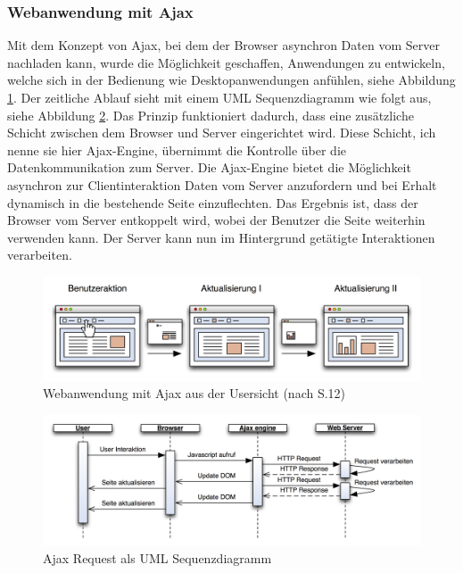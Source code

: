   \subsubsection{Webanwendung mit Ajax}
  
  Mit dem Konzept von \ac{Ajax}, bei dem der Browser asynchron Daten vom Server
  nachladen kann, wurde die Möglichkeit geschaffen, Anwendungen zu entwickeln,
  welche sich in der Bedienung wie Desktopanwendungen anfühlen, siehe Abbildung
  \ref{img:ajaxPageReload}. Der zeitliche Ablauf sieht mit einem \ac{UML}
  Sequenzdiagramm wie folgt aus, siehe Abbildung
  \ref{img:sequenzdiagrammAjaxPageReload}. Das Prinzip funktioniert dadurch,
  dass eine zusätzliche Schicht zwischen dem Browser und Server eingerichtet
  wird. Diese Schicht, ich nenne sie hier Ajax-Engine, übernimmt die Kontrolle
  über die Datenkommunikation zum Server. Die Ajax-Engine bietet die
  Möglichkeit asynchron zur Clientinteraktion Daten vom Server anzufordern und
  bei Erhalt dynamisch in die bestehende Seite einzuflechten. Das Ergebnis ist,
  dass der Browser vom Server entkoppelt wird, wobei der Benutzer die Seite
  weiterhin verwenden kann. Der Server kann nun im Hintergrund getätigte
  Interaktionen verarbeiten.
  
  \begin{figure}[hbt]
    \begin{center}
      \includegraphics[width=\textwidth]{./image/ajaxPageReload.png}
      \caption{Webanwendung mit Ajax aus der Usersicht (nach
      \cite{DiplomarbeitStephanSchuster} S.12)}
      \label{img:ajaxPageReload}
    \end{center}
  \end{figure}
  
  \begin{figure}[hbt]
    \begin{center}
      \includegraphics[width=\textwidth]{./image/sequenzdiagrammAjaxPageReload.png}
      \caption{Ajax Request als \ac{UML} Sequenzdiagramm}
      \label{img:sequenzdiagrammAjaxPageReload}
    \end{center}
  \end{figure}
  
